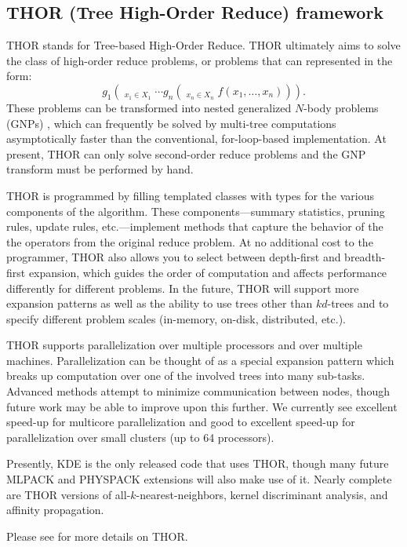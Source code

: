 \documentclass[letter]{report}
\begin{document}
\subsection{THOR (Tree High-Order Reduce) framework}
THOR stands for Tree-based High-Order Reduce. THOR ultimately aims to
solve the class of high-order reduce problems, or problems that can
represented in the form:
\[g_1 \left( \mathop{\bigotimes\nolimits_{\!1}}_{x_1 \in X_1} \cdots g_n \left( \mathop{\bigotimes\nolimits_{\!n}}_{x_n \in X_n} f(x_1,\ldots,x_n) \right) \right) .\]
These problems can be transformed into nested generalized $N$-body
problems (GNPs) \cite{gray2000nbp}, which can frequently be solved
by multi-tree computations asymptotically faster than the
conventional, for-loop-based implementation.  At present, THOR can
only solve second-order reduce problems and the GNP transform must be
performed by hand.

THOR is programmed by filling templated classes with types for the
various components of the algorithm.  These components---summary
statistics, pruning rules, update rules, etc.---implement methods that
capture the behavior of the the operators from the original reduce
problem.  At no additional cost to the programmer, THOR also allows
you to select between depth-first and breadth-first expansion, which
guides the order of computation and affects performance differently
for different problems.  In the future, THOR will support more
expansion patterns as well as the ability to use trees other than
$kd$-trees and to specify different problem scales (in-memory,
on-disk, distributed, etc.).

THOR supports parallelization over multiple processors and over
multiple machines.  Parallelization can be thought of as a special
expansion pattern which breaks up computation over one of the involved
trees into many sub-tasks.  Advanced methods attempt to minimize
communication between nodes, though future work may be able to improve
upon this further.  We currently see excellent speed-up for multicore
parallelization and good to excellent speed-up for parallelization
over small clusters (up to 64 processors).

Presently, KDE is the only released code that uses THOR, though many
future MLPACK and PHYSPACK extensions will also make use of it.
Nearly complete are THOR versions of all-$k$-nearest-neighbors, kernel
discriminant analysis, and affinity propagation.

Please see \cite{boyer2007tho} for more details on THOR.
\end{document}
